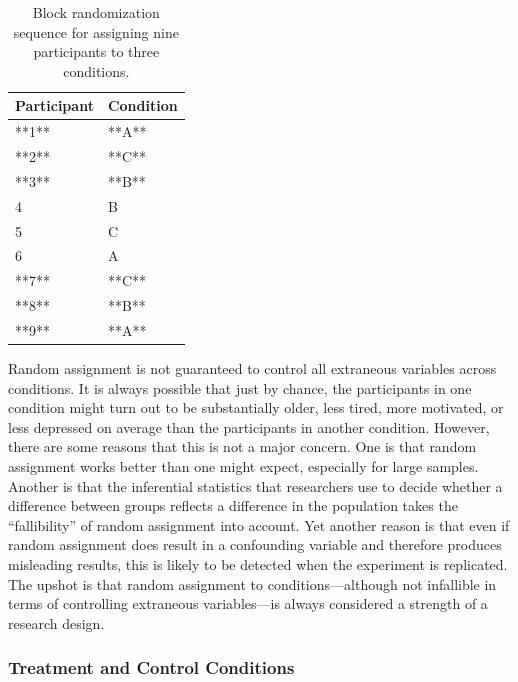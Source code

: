 \documentclass[
]{krantz}
\begin{document}
\begin{table}

\caption{\label{tab:block}Block randomization sequence for assigning nine participants to three conditions.}
\centering
\begin{tabular}[t]{l|l}
\hline
Participant & Condition\\
\hline
**1** & **A**\\
\hline
**2** & **C**\\
\hline
**3** & **B**\\
\hline
4 & B\\
\hline
5 & C\\
\hline
6 & A\\
\hline
**7** & **C**\\
\hline
**8** & **B**\\
\hline
**9** & **A**\\
\hline
\end{tabular}
\end{table}

Random assignment is not guaranteed to control all extraneous variables across conditions. It is always possible that just by chance, the participants in one condition might turn out to be substantially older, less tired, more motivated, or less depressed on average than the participants in another condition. However, there are some reasons that this is not a major concern. One is that random assignment works better than one might expect, especially for large samples. Another is that the inferential statistics that researchers use to decide whether a difference between groups reflects a difference in the population takes the ``fallibility'' of random assignment into account. Yet another reason is that even if random assignment does result in a confounding variable and therefore produces misleading results, this is likely to be detected when the experiment is replicated. The upshot is that random assignment to conditions---although not infallible in terms of controlling extraneous variables---is always considered a strength of a research design.

\subsubsection*{Treatment and Control Conditions}\label{treatment-and-control-conditions}
\end{document}
